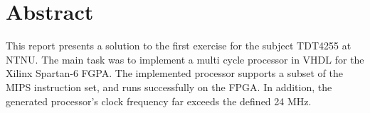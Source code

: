 \section*{Abstract}
\label{sec:abstract}

\vspace*{\fill}
This report presents a solution to the first exercise for the subject TDT4255 at NTNU.
The main task was to implement a multi cycle processor in VHDL for the Xilinx Spartan-6 FGPA.
The implemented processor supports a subset of the MIPS instruction set, and runs successfully on the FPGA.
In addition, the generated processor's clock frequency far exceeds the defined 24 MHz.
\vspace*{\fill}
